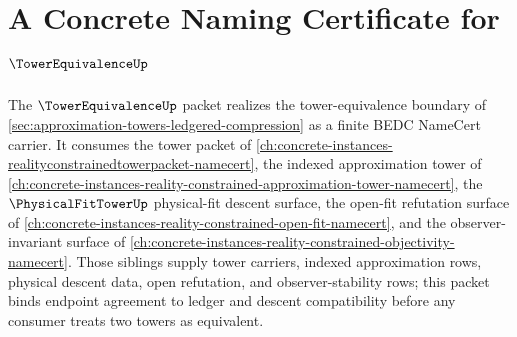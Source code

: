 \chapter{A Concrete Naming Certificate for $\TowerEquivalenceUp$}
\label{ch:concrete-instances-towerequivalence-namecert}

The $\TowerEquivalenceUp$ packet realizes the tower-equivalence boundary of \autoref{sec:approximation-towers-ledgered-compression} as a finite BEDC NameCert carrier. It consumes the tower packet of \autoref{ch:concrete-instances-realityconstrainedtowerpacket-namecert}, the indexed approximation tower of \autoref{ch:concrete-instances-reality-constrained-approximation-tower-namecert}, the $\PhysicalFitTowerUp$ physical-fit descent surface, the open-fit refutation surface of \autoref{ch:concrete-instances-reality-constrained-open-fit-namecert}, and the observer-invariant surface of \autoref{ch:concrete-instances-reality-constrained-objectivity-namecert}. Those siblings supply tower carriers, indexed approximation rows, physical descent data, open refutation, and observer-stability rows; this packet binds endpoint agreement to ledger and descent compatibility before any consumer treats two towers as equivalent.

